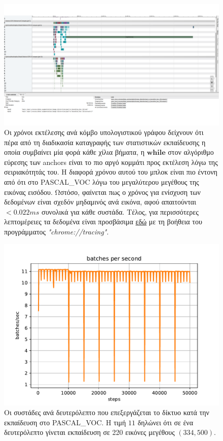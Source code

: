 \begin{figure}
\centering
\includegraphics[width=\textwidth]{figures/experiments/kitti_new_tracing.pdf}
\caption[Χρόνοι εκτέλεσης κάθε επιπέδου στο KITTI]{Οι χρόνοι εκτέλεσης ανά κόμβο υπολογιστικού γράφου δείχνουν ότι πέρα από τη διαδικασία καταγραφής των στατιστικών εκπαίδευσης η οποία συμβαίνει μία φορά κάθε χίλια βήματα, η $\mathbf{while}$ στον αλγόριθμο εύρεσης των anchors είναι το πιο αργό κομμάτι προς εκτέλεση λόγω της σειριακότητάς του. Η διαφορά χρόνου αυτού του μπλοκ είναι πιο έντονη από ότι στο PASCAL\_VOC λόγω του μεγαλύτερου μεγέθους της εικόνας εισόδου. Ωστόσο, φαίνεται πως ο χρόνος για ενίσχυση των δεδομένων είναι σχεδόν μηδαμινός ανά εικόνα, αφού απαιτούνται $< 0.022 ms$ συνολικά για κάθε συστάδα. Τέλος, για περισσότερες λεπτομέρειες τα δεδομένα είναι προσβάσιμα \textcolor{blue}{\href{https://drive.google.com/file/d/16M9N_zbhashiI1PtHV0xSP3WXzdJmZpJ/view?usp=sharing}{εδώ}} με τη βοήθεια του προγράμματος \textit{"chrome://tracing"}.}
\label{fig:kittiTracing}
\end{figure}

\begin{figure}
\centering
\includegraphics[width=\textwidth]{figures/experiments/Btrain2_batches_per_sec.pdf}
\caption[Οι συστάδες ανά δευτερόλεπτο στο PASCAL\_VOC]{Οι συστάδες ανά δευτερόλεπτο που επεξεργάζεται το δίκτυο κατά την εκπαίδευση στο PASCAL\_VOC. Η τιμή $11$ δηλώνει ότι σε ένα δευτερόλεπτο γίνεται εκπαίδευση σε 220 εικόνες μεγέθους $(334, 500)$.}
\label{fig:pascal_batches_per_sec}
\end{figure}

